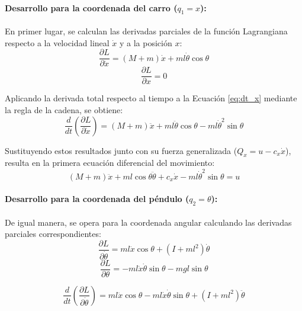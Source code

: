 \documentclass[11pt,fleqn]{book} %
\begin{document}
\paragraph{Desarrollo para la coordenada del carro ($q_1 = x$):}
En primer lugar, se calculan las derivadas parciales de la función Lagrangiana respecto a la velocidad lineal $\dot{x}$ y a la posición $x$:
\begin{equation}
	\frac{\partial L}{\partial \dot{x}} = (M + m)\dot{x} + ml\dot{\theta}\cos\theta
	\label{eq:dt_x}
\end{equation}
\begin{equation}
	\frac{\partial L}{\partial x} = 0
\end{equation}

Aplicando la derivada total respecto al tiempo a la Ecuación \ref{eq:dt_x} mediante la regla de la cadena, se obtiene:
\begin{equation}
	\frac{d}{dt}\left(\frac{\partial L}{\partial \dot{x}}\right) = (M + m)\ddot{x} + ml\ddot{\theta}\cos\theta - ml\dot{\theta}^2\sin\theta
\end{equation}

Sustituyendo estos resultados junto con su fuerza generalizada ($Q_x = u - c_x\dot{x}$), resulta en la primera ecuación diferencial del movimiento:
\begin{equation}
	(M + m)\ddot{x} + ml\cos\theta\ddot{\theta} + c_x\dot{x} - ml\dot{\theta}^2\sin\theta = u
\end{equation}

\paragraph{Desarrollo para la coordenada del péndulo ($q_2 = \theta$):}
De igual manera, se opera para la coordenada angular calculando las derivadas parciales correspondientes:
\begin{equation}
	\frac{\partial L}{\partial \dot{\theta}} = ml\dot{x}\cos\theta + (I + ml^2)\dot{\theta}
\end{equation}
\begin{equation}
	\frac{\partial L}{\partial \theta} = -ml\dot{x}\dot{\theta}\sin\theta - mgl\sin\theta
	\label{lagrange1}
\end{equation}

\begin{equation}
	\frac{d}{dt}\left(\frac{\partial L}{\partial \dot{\theta}}\right) = ml\ddot{x}\cos\theta - ml\dot{x}\dot{\theta}\sin\theta + (I + ml^2)\ddot{\theta}
	\label{lagrange2}
\end{equation}
\end{document}
